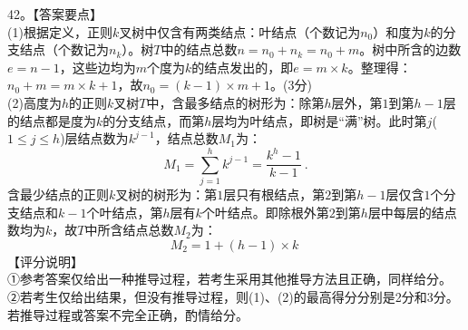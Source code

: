 42。【答案要点】 \\
(1)根据定义，正则$k$叉树中仅含有两类结点：叶结点（个数记为$n_0$）和度为$k$的分支结点（个数记为$n_k$）。树$T$中的结点总数$n=n_0+n_k=n_0+m$。树中所含的边数$e=n-1$，这些边均为$m$个度为$k$的结点发出的，即$e=m\times k$。整理得：$n_0+m=m\times k+1$，故$n_0=(k-1)\times m+1$。(3分) \\
(2)高度为$h$的正则$k$叉树$T$中，含最多结点的树形为：除第$h$层外，第$1$到第$h-1$层的结点都是度为$k$的分支结点，而第$h$层均为叶结点，即树是“满”树。此时第$j$($1\leqslant j\leqslant h$)层结点数为$k^{j-1}$，结点总数$M_1$为：
\begin{equation}
M_1=\sum_{j=1}^{h}k^{j-1}=\frac{k^h-1}{k-1}~.
\end{equation}
含最少结点的正则$k$叉树的树形为：第$1$层只有根结点，第$2$到第$h-1$层仅含$1$个分支结点和$k-1$个叶结点，第$h$层有$k$个叶结点。即除根外第$2$到第$h$层中每层的结点数均为$k$，故$T$中所含结点总数$M_2$为： \\
\begin{equation}
M_2=1+(h-1)\times k~
\end{equation}
【评分说明】 \\
①参考答案仅给出一种推导过程，若考生采用其他推导方法且正确，同样给分。 \\
②若考生仅给出结果，但没有推导过程，则(1)、(2)的最高得分分别是2分和3分。若推导过程或答案不完全正确，酌情给分。

